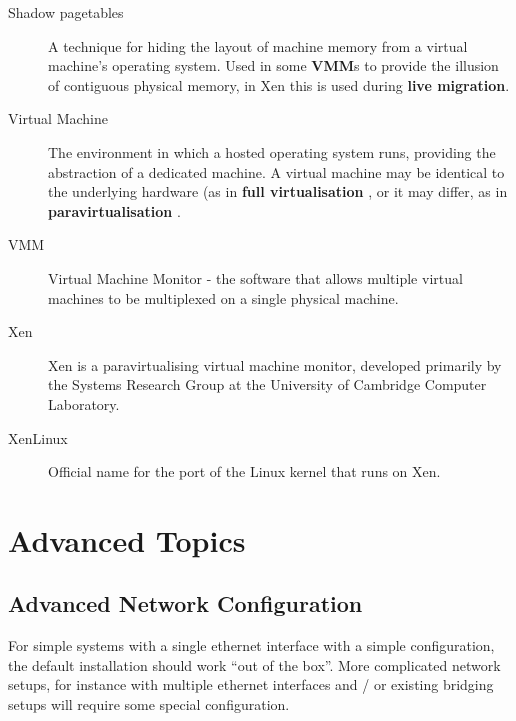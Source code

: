 \documentclass[11pt,twoside,final,openright]{xenstyle}
\begin{document}
{\begin{description}
\item[Shadow pagetables]   A technique for hiding the layout of machine
                           memory from a virtual machine's operating
			   system.  Used in some {\bf VMM}s to provide
			   the illusion of contiguous physical memory,
			   in Xen this is used during
			   {\bf live migration}.

\item[Virtual Machine]     The environment in which a hosted operating
                           system runs, providing the abstraction of a
                           dedicated machine.  A virtual machine may
                           be identical to the underlying hardware (as
                           in { \bf full virtualisation }, or it may
                           differ, as in { \bf paravirtualisation }.

\item[VMM]                 Virtual Machine Monitor - the software that
                           allows multiple virtual machines to be
                           multiplexed on a single physical machine.

\item[Xen]                 Xen is a paravirtualising virtual machine
                           monitor, developed primarily by the
                           Systems Research Group at the University
                           of Cambridge Computer Laboratory.

\item[XenLinux]            Official name for the port of the Linux kernel
                           that runs on Xen.

\end{description}

\part{Advanced Topics}

\chapter{Advanced Network Configuration}

For simple systems with a single ethernet interface with a simple
configuration, the default installation should work ``out of the
box''.  More complicated network setups, for instance with multiple
ethernet interfaces and / or existing bridging setups will require
some special configuration.

}
\end{document}
